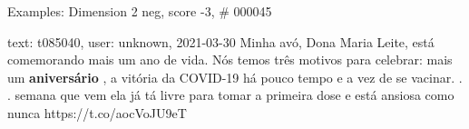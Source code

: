 \begin{frame}{Examples: Dimension 2 neg, score -3, \# 000045}
\footnotesize
\begin{alertblock}{text: t085040, user: unknown, 2021-03-30}
Minha avó, Dona Maria Leite, está comemorando mais um ano de vida. Nós temos 
três motivos para celebrar: mais um \textbf{aniversário} , a vitória da 
COVID-19 há pouco tempo e a vez de se vacinar. . . semana que vem ela já tá 
livre para tomar a primeira dose e está ansiosa como nunca 
  
 https://t.co/aocVoJU9eT 
\end{alertblock}
\end{frame}
